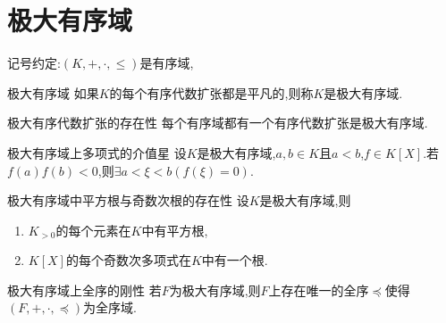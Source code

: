 \section{极大有序域}

记号约定:$\left(K,+,\cdot,\leq\right)$是有序域,

\begin{definition}{极大有序域}{}
	如果$K$的每个有序代数扩张都是平凡的,则称$K$是极大有序域.
\end{definition}

\begin{theorem}{极大有序代数扩张的存在性}{}
	每个有序域都有一个有序代数扩张是极大有序域.
\end{theorem}

\begin{proposition}{极大有序域上多项式的介值星}{}
	设$K$是极大有序域,$a,b\in K$且$a<b$,$f\in K\left[X\right]$.若$f\left(a\right)f\left(b\right)<0$,则$\exists a<\xi<b\left(f\left(\xi\right)=0\right)$.
\end{proposition}

\begin{proposition}{极大有序域中平方根与奇数次根的存在性}{}
	设$K$是极大有序域,则
	\begin{enumerate}
		\item $K_{>0}$的每个元素在$K$中有平方根,
		\item $K\left[X\right]$的每个奇数次多项式在$K$中有一个根.
	\end{enumerate}
\end{proposition}

\begin{corollary}{极大有序域上全序的刚性}{}
	若$F$为极大有序域,则$F$上存在唯一的全序$\preccurlyeq$使得$\left(F,+,\cdot,\preccurlyeq\right)$为全序域.
\end{corollary}
